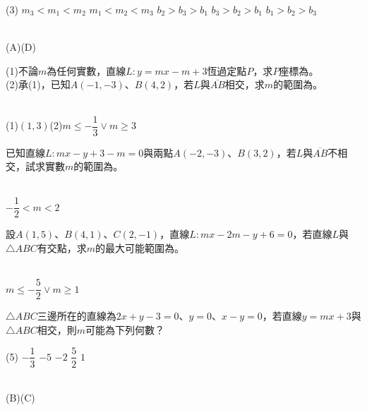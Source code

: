 \documentclass
[answers]
{exam}
\newcommand\ul[1]{\uline{\hspace*{#1}}}
\theoremstyle{definition}
\begin{document}
\begin{questions}
\begin{tasks}(3)
	\task $m_3<m_1<m_2$
	\task $m_1<m_2<m_3$
	\task $b_2>b_3>b_1$
	\task $b_3>b_2>b_1$
	\task $b_1>b_2>b_3$
\end{tasks}
\begin{solution}~\\
	(A)(D)
\end{solution}


\question

(1)不論$m$為任何實數，直線$L:y=mx-m+3$恆過定點$P$，求$P$座標為\ul{50pt}。\\
(2)承(1)，已知$A\left( -1,-3\right)$、$B\left( 4,2\right)$，若$L$與$\overline{AB}$相交，求$m$的範圍為\ul{50pt}。
\\ 
\begin{solution}~\\
	(1)$ \left(  1,3 \right)$(2)$m \leq - \dfrac{1}{3} \vee m \geq 3$
\end{solution}

\question

已知直線$L:mx-y+3-m=0$與兩點$A\left( -2,-3\right)$、$B\left( 3,2\right)$，若$L$與$\overline{AB}$不相交，試求實數$m$的範圍為\ul{50pt}。
\\ 
\begin{solution}~\\
	$-\dfrac{1}{2} < m < 2$
\end{solution}

\question

設$A\left( 1,5\right)$、$B\left( 4,1\right)$、$C\left( 2,-1\right)$，直線$L:mx-2m-y+6=0$，若直線$L$與$\triangle ABC$有交點，求$m$的最大可能範圍為\ul{50pt}。
\\ 
\begin{solution}~\\
		$m \leq - \dfrac{5}{2} \vee m \geq 1$
\end{solution}

\question

$\triangle ABC$三邊所在的直線為$2x+y-3=0$、$y=0$、$x-y=0$，若直線$y=mx+3$與$\triangle ABC$相交，則$m$可能為下列何數？

\begin{tasks}(5)
	\task $-\dfrac{1}{3}$
	\task $ -5$
	\task $-2$
	\task $\dfrac{5}{2}$
	\task $1$
\end{tasks}
\begin{solution}~\\
	(B)(C)
\end{solution}


\end{questions}
\end{document}
